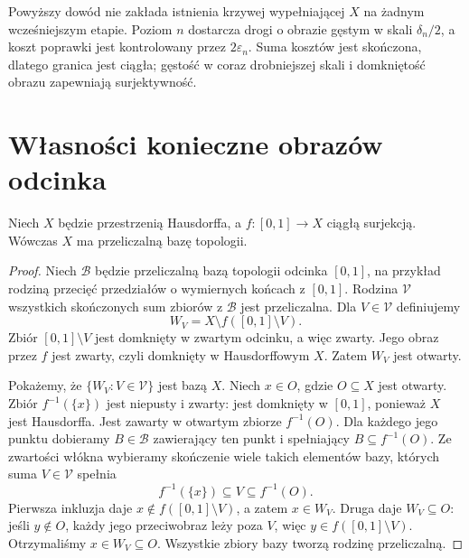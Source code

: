 \begin{uwaga}
\label{rem:topog26-constructive}
Powyższy dowód nie zakłada
istnienia krzywej wypełniającej \(X\)
na żadnym wcześniejszym etapie.
Poziom \(n\) dostarcza drogi
o obrazie gęstym w skali
\(\delta_n/2\), a koszt poprawki
jest kontrolowany przez
\(2\varepsilon_n\).
Suma kosztów jest skończona,
dlatego granica jest ciągła;
gęstość w coraz drobniejszej
skali i domkniętość obrazu
zapewniają surjektywność.
\end{uwaga}

\section{Własności konieczne obrazów odcinka}
\label{sec:topog26-necessity}

\begin{lemat}
\label{lem:topog26-image-second-countable}
Niech \(X\) będzie przestrzenią
Hausdorffa, a
\(f\colon[0,1]\to X\)
ciągłą surjekcją.
Wówczas \(X\) ma
przeliczalną bazę topologii.
\end{lemat}
\begin{proof}
Niech \(\mathcal B\)
będzie przeliczalną bazą
topologii odcinka \([0,1]\),
na przykład rodziną
przecięć przedziałów
o wymiernych końcach z \([0,1]\).
Rodzina \(\mathcal V\)
wszystkich skończonych
sum zbiorów z \(\mathcal B\)
jest przeliczalna.
Dla \(V\in\mathcal V\)
definiujemy
\[
 W_V=X\setminus f([0,1]\setminus V).
\]
Zbiór \([0,1]\setminus V\)
jest domknięty w zwartym odcinku,
a więc zwarty.
Jego obraz przez \(f\)
jest zwarty, czyli domknięty
w Hausdorffowym \(X\).
Zatem \(W_V\) jest otwarty.

Pokażemy, że
\(\{W_V:V\in\mathcal V\}\)
jest bazą \(X\).
Niech \(x\in O\), gdzie
\(O\subseteq X\) jest otwarty.
Zbiór \(f^{-1}(\{x\})\)
jest niepusty i zwarty:
jest domknięty w \([0,1]\),
ponieważ \(X\) jest Hausdorffa.
Jest zawarty w otwartym zbiorze
\(f^{-1}(O)\).
Dla każdego jego punktu
dobieramy \(B\in\mathcal B\)
zawierający ten punkt
i spełniający \(B\subseteq f^{-1}(O)\).
Ze zwartości włókna
wybieramy skończenie wiele
takich elementów bazy,
których suma \(V\in\mathcal V\)
spełnia
\[
 f^{-1}(\{x\})\subseteq V
 \subseteq f^{-1}(O).
\]
Pierwsza inkluzja daje
\(x\notin f([0,1]\setminus V)\),
a zatem \(x\in W_V\).
Druga daje \(W_V\subseteq O\):
jeśli \(y\notin O\),
każdy jego przeciwobraz
leży poza \(V\), więc
\(y\in f([0,1]\setminus V)\).
Otrzymaliśmy \(x\in W_V\subseteq O\).
Wszystkie zbiory bazy
tworzą rodzinę przeliczalną.
\end{proof}

